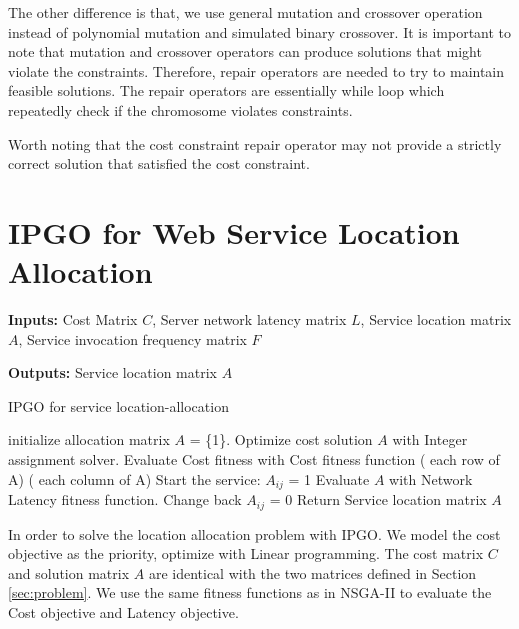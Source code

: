 \documentclass{llncs}
\begin{document}
The other difference is that, we use general mutation and crossover operation instead of polynomial mutation and simulated binary crossover.
It is important to note that mutation and crossover operators can produce solutions that might violate the constraints. 
Therefore, repair operators are needed to try to maintain feasible solutions. The repair operators are essentially while 
loop which repeatedly check if the chromosome violates constraints.

Worth noting that the cost constraint repair operator may not provide a strictly correct solution that satisfied the cost constraint.

\section{IPGO for Web Service Location Allocation}
\begin{algorithm}[htb]
	\textbf{Inputs:}
		Cost Matrix $C$,
		Server network latency matrix $L$, 
		Service location matrix $A$, 
		Service invocation frequency matrix $F$

	\textbf{Outputs:}
		Service location matrix $A$
	\caption{IPGO for service location-allocation}
	\label{IPGO}
	\begin{algorithmic}[1]
		\State initialize allocation matrix $A$ = \{1\}.
		\State Optimize cost solution $A$ with Integer assignment solver.
		\State Evaluate Cost fitness with Cost fitness function
		\For( each row of A)
			\For( each column of A)
					\State Start the service: $A_{ij}$ = 1
					\State Evaluate $A$ with Network Latency fitness function.
						\State Change back $A_{ij}$ = 0
					\EndIf
				\EndIf
			\EndFor
		\EndFor
		\State Return Service location matrix $A$
	\end{algorithmic}
\end{algorithm}
In order to solve the location allocation problem with IPGO. We model the cost objective as the priority, optimize with Linear programming.
The cost matrix $C$ and solution matrix $A$ are identical with the two matrices defined in Section \ref{sec:problem}. We use the same fitness functions as in NSGA-II to 
evaluate the Cost objective and Latency objective.

\end{document}
